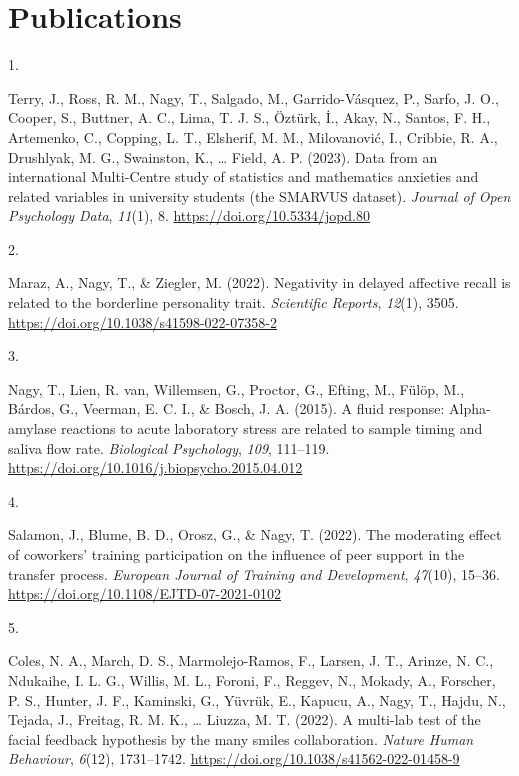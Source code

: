 \documentclass[10pt,a4paper,]{twentysecondcv}
\newlength{\csllabelwidth}
\newcommand{\CSLLeftMargin}[1]{\parbox[t]{\csllabelwidth}{#1}}
\newcommand{\CSLRightInline}[1]{\parbox[t]{\linewidth - \csllabelwidth}{#1}}
\begin{document}
\hypertarget{publications}{%
\section{Publications}\label{publications}}

\hypertarget{bibliography}{}
\leavevmode{}%
\CSLLeftMargin{1. }%
\CSLRightInline{Terry, J., Ross, R. M., Nagy, T., Salgado, M.,
Garrido-Vásquez, P., Sarfo, J. O., Cooper, S., Buttner, A. C., Lima, T.
J. S., Öztürk, İ., Akay, N., Santos, F. H., Artemenko, C., Copping, L.
T., Elsherif, M. M., Milovanović, I., Cribbie, R. A., Drushlyak, M. G.,
Swainston, K., \ldots{} Field, A. P. (2023). Data from an international
Multi-Centre study of statistics and mathematics anxieties and related
variables in university students (the SMARVUS dataset). \emph{Journal of
Open Psychology Data}, \emph{11}(1), 8.
\url{https://doi.org/10.5334/jopd.80}}

\leavevmode{}%
\CSLLeftMargin{2. }%
\CSLRightInline{Maraz, A., Nagy, T., \& Ziegler, M. (2022). Negativity
in delayed affective recall is related to the borderline personality
trait. \emph{Scientific Reports}, \emph{12}(1), 3505.
\url{https://doi.org/10.1038/s41598-022-07358-2}}

\leavevmode{}%
\CSLLeftMargin{3. }%
\CSLRightInline{Nagy, T., Lien, R. van, Willemsen, G., Proctor, G.,
Efting, M., Fülöp, M., Bárdos, G., Veerman, E. C. I., \& Bosch, J. A.
(2015). A fluid response: Alpha-amylase reactions to acute laboratory
stress are related to sample timing and saliva flow rate.
\emph{Biological Psychology}, \emph{109}, 111--119.
\url{https://doi.org/10.1016/j.biopsycho.2015.04.012}}

\leavevmode{}%
\CSLLeftMargin{4. }%
\CSLRightInline{Salamon, J., Blume, B. D., Orosz, G., \& Nagy, T.
(2022). The moderating effect of coworkers' training participation on
the influence of peer support in the transfer process. \emph{European
Journal of Training and Development}, \emph{47}(10), 15--36.
\url{https://doi.org/10.1108/EJTD-07-2021-0102}}

\leavevmode{}%
\CSLLeftMargin{5. }%
\CSLRightInline{Coles, N. A., March, D. S., Marmolejo-Ramos, F., Larsen,
J. T., Arinze, N. C., Ndukaihe, I. L. G., Willis, M. L., Foroni, F.,
Reggev, N., Mokady, A., Forscher, P. S., Hunter, J. F., Kaminski, G.,
Yüvrük, E., Kapucu, A., Nagy, T., Hajdu, N., Tejada, J., Freitag, R. M.
K., \ldots{} Liuzza, M. T. (2022). A multi-lab test of the facial
feedback hypothesis by the many smiles collaboration. \emph{Nature Human
Behaviour}, \emph{6}(12), 1731--1742.
\url{https://doi.org/10.1038/s41562-022-01458-9}}
\end{document}
